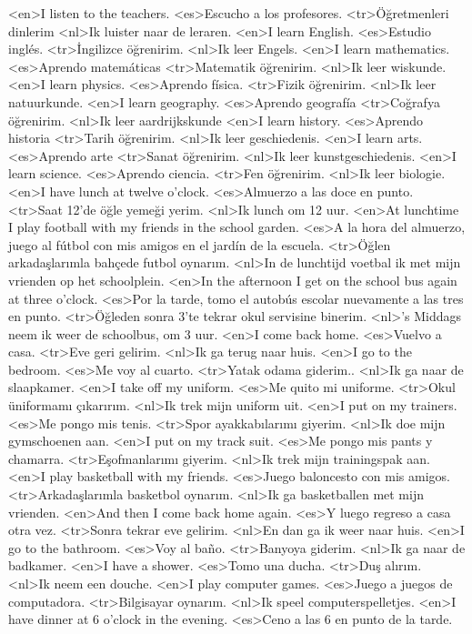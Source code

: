 <en>I listen to the teachers.
<es>Escucho a los profesores.
<tr>Öğretmenleri dinlerim
<nl>Ik luister naar de leraren.
<en>I learn English.
<es>Estudio inglés.
<tr>İngilizce öğrenirim.
<nl>Ik leer Engels.
<en>I learn mathematics.
<es>Aprendo matemáticas
<tr>Matematik öğrenirim.
<nl>Ik leer wiskunde.
<en>I learn physics.
<es>Aprendo física.
<tr>Fizik öğrenirim.
<nl>Ik leer natuurkunde.
<en>I learn geography.
<es>Aprendo geografía
<tr>Coğrafya öğrenirim.
<nl>Ik leer aardrijkskunde
<en>I learn history.
<es>Aprendo historia
<tr>Tarih öğrenirim.
<nl>Ik leer geschiedenis.
<en>I learn arts.
<es>Aprendo arte
<tr>Sanat öğrenirim.
<nl>Ik leer kunstgeschiedenis.
<en>I learn science.
<es>Aprendo ciencia.
<tr>Fen öğrenirim.
<nl>Ik leer biologie.
<en>I have lunch at twelve o’clock.
<es>Almuerzo a las doce en punto.
<tr>Saat 12’de öğle yemeği yerim.
<nl>Ik lunch om 12 uur.
<en>At lunchtime I play football with my friends in the school garden.
<es>A la hora del almuerzo, juego al fútbol con mis amigos en el jardín de la escuela.
<tr>Öğlen arkadaşlarımla bahçede futbol oynarım.
<nl>In de lunchtijd voetbal ik met mijn vrienden op het schoolplein.  
<en>In the afternoon I get on the school bus again at three o’clock.
<es>Por la tarde, tomo el autobús escolar nuevamente a las tres en punto.
<tr>Öğleden sonra 3'te tekrar okul servisine binerim.
<nl>'s Middags neem ik weer de schoolbus, om 3 uur.
<en>I come back home.
<es>Vuelvo a casa.
<tr>Eve geri gelirim.
<nl>Ik ga terug naar huis.
<en>I go to the bedroom.
<es>Me voy al cuarto.
<tr>Yatak odama giderim..
<nl>Ik ga naar de slaapkamer.
<en>I take off my uniform.
<es>Me quito mi uniforme.
<tr>Okul üniformamı çıkarırım.
<nl>Ik trek mijn uniform uit.
<en>I put on my trainers.
<es>Me pongo mis tenis.
<tr>Spor ayakkabılarımı giyerim.
<nl>Ik doe mijn gymschoenen aan.
<en>I put on my track suit.
<es>Me pongo mis pants y chamarra.
<tr>Eşofmanlarımı giyerim.
<nl>Ik trek mijn trainingspak aan.
<en>I play basketball with my friends.
<es>Juego baloncesto con mis amigos.
<tr>Arkadaşlarımla basketbol oynarım.
<nl>Ik ga basketballen met mijn vrienden.
<en>And then I come back home again.
<es>Y luego regreso a casa otra vez.
<tr>Sonra tekrar eve gelirim.
<nl>En dan ga ik weer naar huis.
<en>I go to the bathroom.
<es>Voy al baño.
<tr>Banyoya giderim.
<nl>Ik ga naar de badkamer.
<en>I have a shower.
<es>Tomo una ducha.
<tr>Duş alırım.
<nl>Ik neem een douche.
<en>I play computer games.
<es>Juego a juegos de computadora.
<tr>Bilgisayar oynarım.
<nl>Ik speel computerspelletjes.
<en>I have dinner at 6 o’clock in the evening.
<es>Ceno a las 6 en punto de la tarde.
